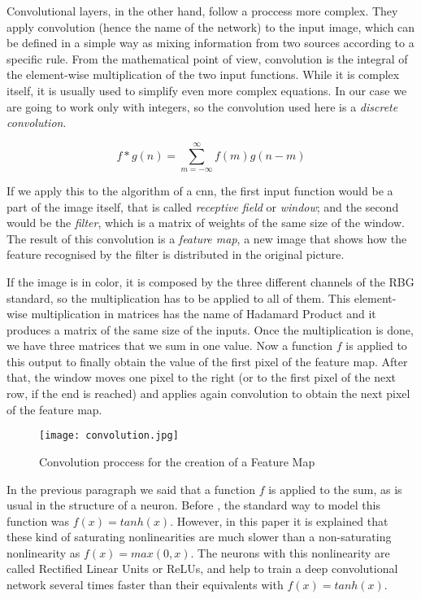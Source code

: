 Convolutional layers, in the other hand, follow a proccess more complex. They apply convolution (hence the name of the network) to the input image, which can be defined in a simple way as mixing information from two sources according to a specific rule. From the mathematical point of view, convolution is the integral of the element-wise multiplication of the two input functions. While it is complex itself, it is usually used to simplify even more complex equations. In our case we are going to work only with integers, so the convolution used here is a \textit{discrete convolution}. 

\begin{equation}
	\label{discrete_conv}
	f*g(n) = \sum_{m= -\infty}^{\infty} f(m) g(n-m) 
\end{equation}

If we apply this to the algorithm of a \gls{cnn}, the first input function would be a part of the image itself, that is called \textit{receptive field} or \textit{window}; and the second would be the \textit{filter}, which is a matrix of weights of the same size of the window. The result of this convolution is a \textit{feature map}, a new image that shows how the feature recognised by the filter is distributed in the original picture. 

If the image is in color, it is composed by the three different channels of the RBG standard, so the multiplication has to be applied to all of them. This element-wise multiplication in matrices has the name of Hadamard Product and it produces a matrix of the same size of the inputs. Once the multiplication is done, we have three matrices that we sum in one value. Now a function $f$ is applied to this output to finally obtain the value of the first pixel of the feature map. After that, the window moves one pixel to the right (or to the first pixel of the next row, if the end is reached) and applies again convolution to obtain the next pixel of the feature map. 

\begin{figure}[ht]
	\centering
	\texttt{[image: convolution.jpg]}
	\caption{Convolution proccess for the creation of a Feature Map}
	\label{fig:convol_creation_feature_map}
\end{figure}

In the previous paragraph we said that a function $f$ is applied to the sum, as is usual in the structure of a neuron. Before \cite{krizhevsky2012deep}, the standard way to model this function was $f(x)=tanh(x)$. However, in this paper it is explained that these kind of saturating nonlinearities are much slower than a non-saturating nonlinearity as $f(x)=max(0, x)$. The neurons with this nonlinearity are called Rectified Linear Units or ReLUs, and help to train a deep convolutional network several times faster than their equivalents with $f(x)=tanh(x)$.

